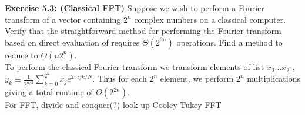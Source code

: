 \documentclass{article}
\begin{document}
\begin{tcolorbox}\textbf{Exercise 5.3: (Classical FFT)} Suppose we wish to perform a Fourier transform of a vector containing $2^n$ complex numbers on a classical computer. Verify that the straightforward method for performing the Fourier transform based on direct evaluation of requires $\Theta(2^{2n})$ operations. Find a method to reduce to $\Theta(n 2^n)$.\\
	To perform the classical Fourier transform we transform elements of list $x_0 \dots x_{2^n}$, $y_k \equiv \frac{1}{2^{n/2}} \sum^{2^n}_{k=0} x_j e^{2\pi ijk / N}$. Thus for each $2^n$ element, we perform $2^n$ multiplications giving a total runtime of $\Theta(2^{2n})$. \\
	For FFT, divide and conquer(?) look up Cooley-Tukey FFT
\end{tcolorbox}
\end{document}

